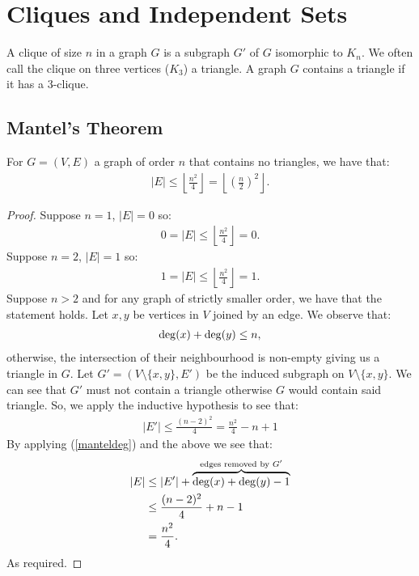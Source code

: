 \section{Cliques and Independent Sets}

A clique of size $n$ in a graph $G$ is a subgraph $G'$ of $G$ isomorphic
to $K_n$.
We often call the clique on three vertices ($K_3$) a triangle. 
A graph $G$ contains a triangle if it has a $3$-clique.

\subsection{Mantel's Theorem}

For $G = (V, E)$ a graph of order $n$ that contains no triangles, we have that: \begin{gather*}
  |E| \leq \left\lfloor \frac{n^2}{4} \right\rfloor = \left\lfloor \left(\frac{n}{2}\right)^2 \right\rfloor.
\end{gather*}
\begin{proof}
    Suppose $n = 1$, $|E| = 0$ so: \begin{gather*}
        0 = |E| \leq \left\lfloor \frac{n^2}{4} \right\rfloor = 0.
    \end{gather*}
    Suppose $n = 2$, $|E| = 1$ so: \begin{gather*}
        1 = |E| \leq \left\lfloor \frac{n^2}{4} \right\rfloor = 1.
    \end{gather*}
    Suppose $n > 2$ and for any graph of strictly smaller order, we have that
    the statement holds. Let $x, y$ be vertices in $V$ joined by an edge. We
    observe that: \begin{gather} \label{manteldeg}
        \operatorname{deg}(x) + \operatorname{deg}(y) \leq n,
    \end{gather} otherwise, the intersection of their neighbourhood is 
    non-empty giving us a triangle in $G$. Let $G' = (V \setminus \{x, y\}, E')$ 
    be the induced subgraph on $V \setminus \{x, y\}$. We can see that 
    $G'$ must not contain a triangle otherwise $G$ would contain said triangle.
    So, we apply the inductive hypothesis to see that: \begin{gather*}
        |E'| \leq \frac{(n - 2)^2}{4} = \frac{n^2}{4} - n + 1
    \end{gather*} 
    By applying (\ref{manteldeg}) and the above we see that: \begin{align*}
        |E| &\leq |E'| +
        \overbrace{\operatorname{deg}(x) + \operatorname{deg}(y) - 1}^\text{edges removed by $G'$} \\
        &\leq \frac{(n - 2)^2}{4} + n - 1 \\
        &= \frac{n^2}{4}.
    \end{align*} As required.
\end{proof}

